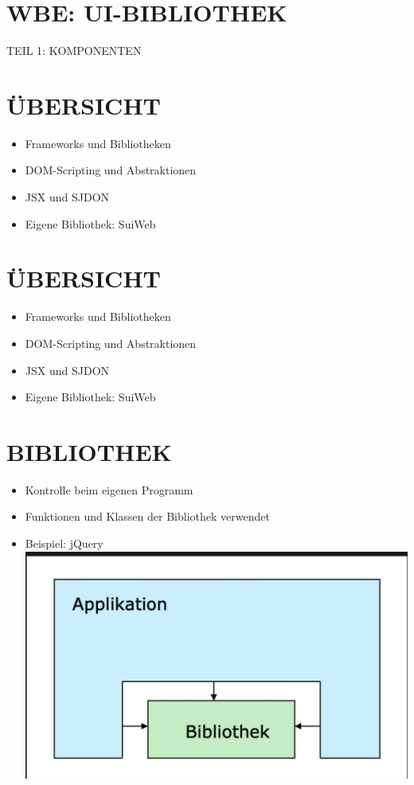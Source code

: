\documentclass[10pt]{article}
\begin{document}
\section*{WBE: UI-BIBLIOTHEK}
 TEIL 1: KOMPONENTEN\section*{ÜBERSICHT}
\begin{itemize}
  \item Frameworks und Bibliotheken
  \item DOM-Scripting und Abstraktionen
  \item JSX und SJDON
  \item Eigene Bibliothek: SuiWeb
\end{itemize}

\section*{ÜBERSICHT}
\begin{itemize}
  \item Frameworks und Bibliotheken
  \item DOM-Scripting und Abstraktionen
  \item JSX und SJDON
  \item Eigene Bibliothek: SuiWeb
\end{itemize}

\section*{BIBLIOTHEK}
\begin{itemize}
  \item Kontrolle beim eigenen Programm
  \item Funktionen und Klassen der Bibliothek verwendet
  \item Beispiel: jQuery\\
\includegraphics[max width=\textwidth, center]{2025_01_02_22162ee5453ad0230328g-04}
\end{itemize}
\end{document}
